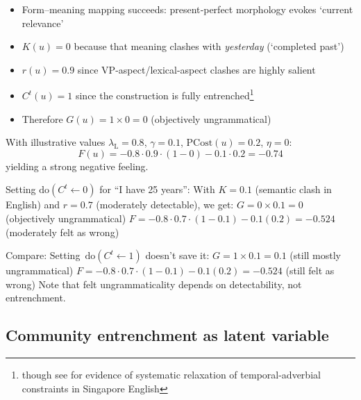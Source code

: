 \documentclass[12pt]{article}
\newcommand{\listener}{\mathrm{L}}
\begin{document}
\begin{itemize}
  \item Form–meaning mapping succeeds: present‑perfect morphology evokes `current relevance'
  \item $K(u)=0$ because that meaning clashes with \textit{yesterday} (`completed past')
  \item $r(u)=0.9$ since VP-aspect/lexical-aspect clashes are highly salient
  \item $C^{t}(u)=1$ since the construction is fully entrenched\footnote{though see \textcite{lai2013opt} for evidence of systematic relaxation of temporal-adverbial constraints in Singapore English}
  \item Therefore $G(u)=1\times0=0$ (objectively ungrammatical)
\end{itemize}
With illustrative values $\lambda_{\listener}=0.8$, $\gamma=0.1$, $\text{PCost}(u)=0.2$, $\eta=0$:
\begin{equation}
F(u)=-0.8\cdot0.9\cdot(1-0)-0.1\cdot0.2=-0.74
\end{equation}
yielding a strong negative feeling.

\begin{tcolorbox}[colback=lsLightBlue!20,title=Causal intervention example]
Setting $\text{do}(C^{t} \leftarrow 0)$ for \enquote{I have 25 years}:
With $K = 0.1$ (semantic clash in English) and $r = 0.7$ (moderately detectable), we get:
$G = 0 \times 0.1 = 0$ (objectively ungrammatical)
$F = -0.8 \cdot 0.7 \cdot (1-0.1) - 0.1(0.2) = -0.524$ (moderately felt as wrong)

Compare: Setting~$\text{do}(C^{t} \leftarrow 1)$ doesn't save it:
$G = 1 \times 0.1 = 0.1$ (still mostly ungrammatical)
$F = -0.8 \cdot 0.7 \cdot (1-0.1) - 0.1(0.2) = -0.524$ (still felt as wrong)
Note that felt ungrammaticality depends on detectability, not entrenchment.
\end{tcolorbox}

\subsection{Community entrenchment as latent variable}
\end{document}
